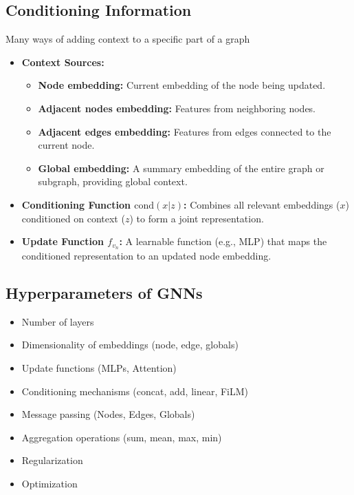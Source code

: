 \subsection{Conditioning Information}
\begin{notes}
    Many ways of adding context to a specific part of a graph \\
    \begin{itemize}    
        \item \textbf{Context Sources:}
        \begin{itemize}
            \item \textbf{Node embedding:} Current embedding of the node being updated.
            \item \textbf{Adjacent nodes embedding:} Features from neighboring nodes.
            \item \textbf{Adjacent edges embedding:} Features from edges connected to the current node.
            \item \textbf{Global embedding:} A summary embedding of the entire graph or subgraph, providing global context.
        \end{itemize}
    
        \item \textbf{Conditioning Function \(\text{cond}(x|z)\):} Combines all relevant embeddings (\(x\)) conditioned on context (\(z\)) to form a joint representation.
    
        \item \textbf{Update Function \(f_{v_n}\):} A learnable function (e.g., MLP) that maps the conditioned representation to an updated node embedding.
    \end{itemize}    
\end{notes}

\subsection{Hyperparameters of GNNs}
\begin{notes}
    \begin{itemize}
        \item Number of layers
        \item Dimensionality of embeddings (node, edge, globals)
        \item Update functions (MLPs, Attention)
        \item Conditioning mechanisms (concat, add, linear, FiLM)
        \item Message passing (Nodes, Edges, Globals)
        \item Aggregation operations (sum, mean, max, min)
        \item Regularization
        \item Optimization
    \end{itemize}
\end{notes}


